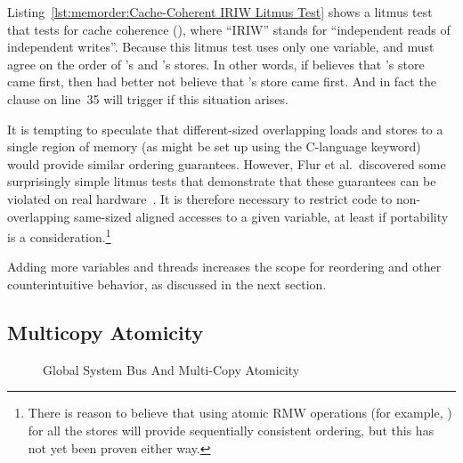 Listing~\ref{lst:memorder:Cache-Coherent IRIW Litmus Test}
shows a litmus test that tests for cache coherence
(), where ``IRIW'' stands
for ``independent reads of independent writes''.
Because this litmus test uses only one variable,
 and  must agree
on the order of 's and 's stores.
In other words, if  believes that 's store
came first, then  had better not believe that
's store came first.
And in fact the  clause on line~35 will trigger if this
situation arises.

It is tempting to speculate that different-sized overlapping loads 
and stores to a single region of memory (as might be set up using
the C-language  keyword) would provide similar ordering
guarantees.
However, Flur et al.~discovered some surprisingly simple
litmus tests that demonstrate that these guarantees can be violated on
real hardware~\cite{Flur:2017:MCA:3093333.3009839}.
It is therefore necessary to restrict code to non-overlapping
same-sized aligned accesses to a given variable, at least if portability
is a consideration.\footnote{
	There is reason to believe that using atomic RMW operations
	(for example, ) for all the stores will
	provide sequentially consistent ordering, but this has not
	yet been proven either way.}

Adding more variables and threads increases the scope for reordering
and other counterintuitive behavior, as discussed in the next section.

\subsection{Multicopy Atomicity}
\label{sec:memorder:Multicopy Atomicity}

\begin{figure}[tb]
\centering
{}
\caption{Global System Bus And Multi-Copy Atomicity}
\label{fig:memorder:Global System Bus And Multi-Copy Atomicity}
\end{figure}

